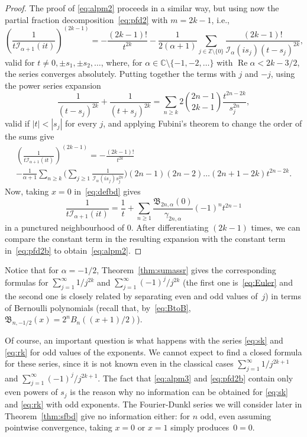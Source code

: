 \documentclass[10pt,a4paper]{article}
\theoremstyle{plain}
\theoremstyle{definition}
\numberwithin{equation}{section} %
\newcommand{\I}{\mathcal{I}}
\newcommand{\B}{\mathfrak{B}}
\newcommand{\CC}{\mathbb{C}}
\newcommand{\ZZO}{\mathbb{Z} \setminus \{0\}}
\newcommand{\cc}{\gamma}
\renewcommand{\Re}{\operatorname{Re}}
\begin{document}
\begin{proof}
The proof of \eqref{eq:alpm2} proceeds in a similar way, but using now the partial fraction decomposition~\eqref{eq:pfd2} with $m=2k-1$, i.e.,
\[
  \left(\frac{1}{t\I_{\alpha+1}(it)}\right)^{(2k-1)}
  = -\frac{(2k-1)!}{t^{2k}} - \frac{1}{2(\alpha+1)}
    \sum_{j\in\ZZO} \frac{(2k-1)!}{\I_\alpha(is_j)(t-s_j)^{2k}},
\]
valid for $t \not= 0, \pm s_1, \pm s_2, \dots$, where, for $\alpha\in \CC\setminus\{-1,-2,\dots \}$ with $\Re \alpha < 2k-3/2$, the series converges absolutely. Putting together the terms with $j$ and $-j$, using the power series expansion
\[
   \frac{1}{(t-s_j)^{2k}} + \frac{1}{(t+s_j)^{2k}}
   = \sum_{n \geq k}
   2 \binom{2n-1}{2k-1} \frac{t^{2n-2k}}{s_j^{2n}},
\]
valid if $|t| < |s_j|$ for every $j$, and applying Fubini's theorem to change the order of the sums give
\begin{multline}
\label{eq:pfd2b}
  \left(\frac{1}{t\I_{\alpha+1}(it)}\right)^{(2k-1)}
  = -\frac{(2k-1)!}{t^{2k}}
  \\- \frac{1}{\alpha+1}
    \sum_{n\geq k}
    \Big(\sum_{j\geq 1} \frac{1}{\I_\alpha(is_j)s_j^{2n}} \Big)
    (2n-1)(2n-2)\dots(2n+1-2k) t^{2n-2k}.
\end{multline}
Now, taking $x=0$ in~\eqref{eq:defbd} gives
\[
   \frac{1}{t\I_{\alpha+1}(it)} = \frac{1}{t} + \sum_{n\geq 1}
   \frac{\B_{2n,\alpha}(0)}{\cc_{2n,\alpha}} (-1)^n t^{2n-1}
\]
in a punctured neighbourhood of $0$.
After differentiating $(2k-1)$ times, we can compare the constant term in the resulting expansion with the constant term in~\eqref{eq:pfd2b} to obtain~\eqref{eq:alpm2}.
\end{proof}

Notice that for $\alpha=-1/2$, Theorem~\ref{thm:sumassr} gives the corresponding formulas for $\sum_{j=1}^{\infty} 1/j^{2k}$ and $\sum_{j=1}^{\infty} (-1)^j/j^{2k}$ (the first one is~\eqref{eq:Euler} and the second one is closely related by separating even and odd values of~$j$) in terms of Bernoulli polynomials (recall that, by~\eqref{eq:BtoB}, $\B_{n,-1/2}(x) = 2^n B_n((x+1)/2)$).

Of course, an important question is what happens with the series \eqref{eq:sk} and \eqref{eq:rk} for odd values of the exponents. We cannot expect to find a closed formula for these series, since it is not known even in the classical cases $\sum_{j=1}^{\infty} 1/j^{2k+1}$ and $\sum_{j=1}^{\infty} (-1)^j/j^{2k+1}$. The fact that \eqref{eq:alpm3} and \eqref{eq:pfd2b} contain only even powers of $s_j$ is the reason why no information can be obtained for \eqref{eq:sk} and \eqref{eq:rk} with odd exponents. The Fourier-Dunkl series we will consider later in Theorem~\ref{thm:sfbd} give no information either: for $n$ odd, even assuming pointwise convergence, taking $x=0$ or $x=1$ simply produces~$0=0$.
\end{document}
